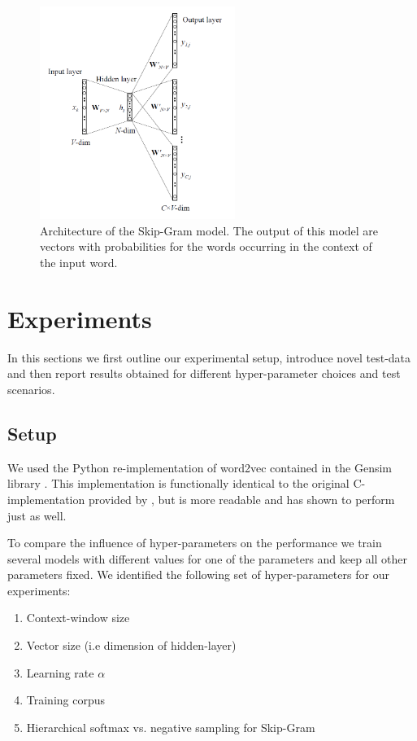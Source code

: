 \documentclass[conference]{IEEEtran}
\begin{document}
\begin{figure}[t]
\centering
\includegraphics[width=2.5in]{skip-gram}
\caption{Architecture of the Skip-Gram model. The output of this model are vectors with probabilities 
for the words occurring in the context of the input word.}
\label{fig:skip}
\end{figure}


\section{Experiments}
\label{sec:exp}

In this sections we first outline our experimental setup, introduce novel test-data
 and then report results obtained for different hyper-parameter choices and test scenarios. 

\subsection{Setup}
We used the Python re-implementation of word2vec contained in the Gensim library 
\cite{rehurek_lrec}. This implementation is functionally identical to the original 
C-implementation provided by \cite{mikolov2013efficient}, but is more readable and has 
shown to perform just as well. 

To compare the influence of hyper-parameters on the performance we train several models
with different values for one of the parameters and keep all other parameters fixed. We 
identified the following set of hyper-parameters for our experiments:
\begin{enumerate}
\item Context-window size
\item Vector size (i.e dimension of hidden-layer)
\item Learning rate $\alpha$
\item Training corpus
\item Hierarchical softmax vs. negative sampling for Skip-Gram
\end{enumerate}
\end{document}
